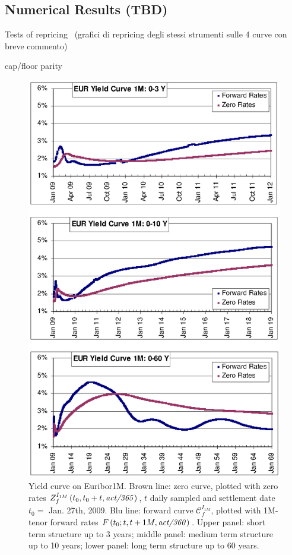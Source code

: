 \documentclass[11pt,reqno]{amsart}
\begin{document}
\subsection{Numerical Results (TBD)}
Tests of repricing \ (grafici di repricing degli stessi strumenti sulle 4
curve con breve commento)

cap/floor parity

\begin{figure}[tbp]
\centering
\includegraphics[scale=0.9]{./FigYC1M}
\caption{Yield curve on Euribor1M. Brown line: zero curve, plotted with zero rates $Z_{f}^{I_{1M}}\left(t_{0},t_{0}+t,\text{\textit{act/365}}\right)$, $t$ daily sampled and settlement date $t_{0}=$ Jan. 27th, 2009. Blu line: forward curve $\mathcal{C}_{f}^{I_{1M}}$, plotted with 1M-tenor forward rates $F\left( t_{0};t,t+1M,\text{\textit{act/360}}\right) $. Upper panel: short term structure up to 3 years; middle panel: medium term structure up to 10 years; lower panel: long term structure up to 60 years.}
\label{FigYC1M}
\end{figure}
\end{document}
